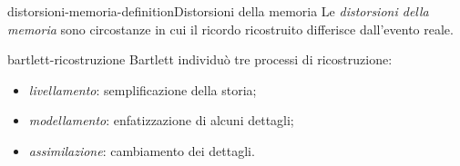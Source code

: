 \documentclass[preview]{standalone}
\begin{document}
\begin{snippetdefinition}{distorsioni-memoria-definition}{Distorsioni della memoria}
    Le \emph{distorsioni della memoria} sono circostanze in cui il ricordo
    ricostruito differisce dall'evento reale.
\end{snippetdefinition}

\begin{snippet}{bartlett-ricostruzione}
    Bartlett individuò tre processi di ricostruzione:
    \begin{itemize}
        \item \emph{livellamento}: semplificazione della storia;
        \item \emph{modellamento}: enfatizzazione di alcuni dettagli;
        \item \emph{assimilazione}: cambiamento dei dettagli.
    \end{itemize}
\end{snippet}

\end{document}
